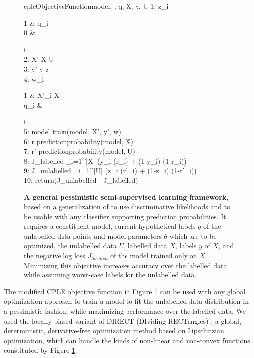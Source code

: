 \begin{figure}[h]
	\begin{pseudocode}{cpleObjectiveFunction}{model, \theta, q, X, y, U}
		1:  \enspace z_i \GETS \begin{cases}
			1 &  q_i \\
			0 & 
		\end{cases} \enspace {} \enspace i \in [1, |U|] \\
		2: X' \GETS X \cup U \\
		3: y' \GETS y \cup z \\
		4:  \enspace w_i \GETS \begin{cases}
			1 &  X'_i \in X \\
			q_i & 
		\end{cases} \enspace {} \enspace i \in [1, |X'|] \\
		5: model \GETS train(model, X', y', w) \\
		6: r \GETS predictionprobability(model, X) \\
		7: r' \GETS predictionprobability(model, U) \\
		8: J_{labelled} \GETS {} \sum_{i=1}^{|X|} (y_i  (r_i) + (1-y_i)  (1-r_i)) \\
		9: J_{unlabelled} \GETS {} \sum_{i=1}^{|U|} (z_i  (r'_i) + (1-z_i)  (1-r'_i)) \\
		10: return(J_{unlabelled} - J_{labelled})
	\end{pseudocode}
	\caption[Objective function for a general pessimistic semi-supervised learning framework]{\textbf{A general pessimistic semi-supervised learning framework,} based on a generalization of \citep{loog2015contrastive} to use discriminative likelihoods and to be usable with any classifier supporting prediction probabilities. It requires a constituent model, current hypothetical labels $q$ of the unlabelled data points and model parameters $\theta$ which are to be optimized, the unlabelled data $U$, labelled data $X$, labels $y$ of $X$, and the negative log loss $J_{labelled}$ of the model trained only on $X$. Minimizing this objective increases accuracy over the labelled data while assuming worst-case labels for the unlabelled data.}
	\label{cplealg}
\end{figure}


The modified CPLE objective function in Figure \ref{cplealg} can be used with any global optimization approach to train a model to fit the unlabelled data distribution in a pessimistic fashion, while maximizing performance over the labelled data. We used the locally biased variant \citep{gablonsky2001locally} of DIRECT (DIviding RECTangles) \citep{jones1993lipschitzian}, a global, deterministic, derivative-free optimization method based on Lipschitzian optimization, which can handle the kinds of non-linear and non-convex functions constituted by Figure \ref{cplealg}. 


